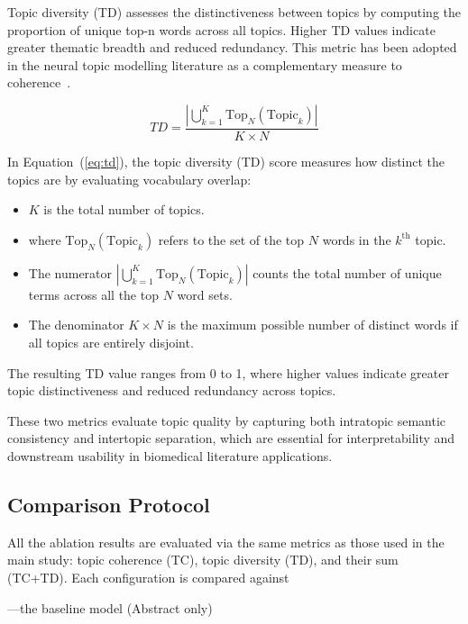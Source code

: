 \documentclass[authorproof,JACIII,researchpaper]{fujipressarticle}
\begin{document}
Topic diversity (TD) assesses the distinctiveness between topics by computing the proportion of unique top-n words across all topics. Higher TD values indicate greater thematic breadth and reduced redundancy. This metric has been adopted in the neural topic modelling literature as a complementary measure to coherence~\cite{dieng_topic_2020}.

\begin{equation}
TD = \frac{\left|\bigcup_{k=1}^{K} \text{Top}_N(\text{Topic}_k)\right|}{K \times N}
\label{eq:td}
\end{equation}

In Equation~(\ref{eq:td}), the topic diversity (TD) score measures how distinct the topics are by evaluating vocabulary overlap:

\begin{itemize}
    \item $K$ is the total number of topics.

    \item where $\text{Top}_N(\text{Topic}_k)$ refers to the set of the top $N$ words in the $k^{\text{th}}$ topic.

    \item The numerator $\left|\bigcup_{k=1}^{K} \text{Top}_N(\text{Topic}_k)\right|$ counts the total number of unique terms across all the top $N$ word sets.

    \item The denominator $K \times N$ is the maximum possible number of distinct words if all topics are entirely disjoint.
\end{itemize}

The resulting TD value ranges from 0 to 1, where higher values indicate greater topic distinctiveness and reduced redundancy across topics.

These two metrics evaluate topic quality by capturing both intratopic semantic consistency and intertopic separation, which are essential for interpretability and downstream usability in biomedical literature applications.

\subsection{Comparison Protocol}
All the ablation results are evaluated via the same metrics as those used in the main study: topic coherence (TC), topic diversity (TD), and their sum (TC+TD). Each configuration is compared against

---the baseline model (Abstract only)
\end{document}
